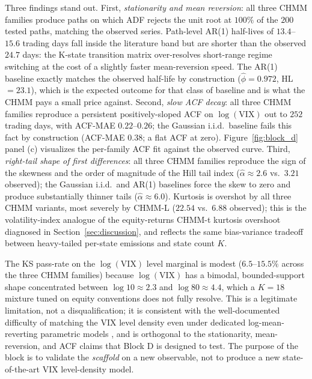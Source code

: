 Three findings stand out.
First, \emph{stationarity and mean reversion}: all three CHMM families produce paths on which ADF rejects the unit root at $100\%$ of the $200$ tested paths, matching the observed series.
Path-level AR(1) half-lives of $13.4$--$15.6$ trading days fall inside the literature band but are shorter than the observed $24.7$ days: the K-state transition matrix over-resolves short-range regime switching at the cost of a slightly faster mean-reversion speed.
The AR(1) baseline exactly matches the observed half-life by construction (${\hat\phi = 0.972}$, HL $= 23.1$), which is the expected outcome for that class of baseline and is what the CHMM pays a small price against.
Second, \emph{slow ACF decay}: all three CHMM families reproduce a persistent positively-sloped ACF on $\log(\text{VIX})$ out to $252$ trading days, with ACF-MAE $0.22$--$0.26$; the Gaussian i.i.d.\ baseline fails this fact by construction (ACF-MAE $0.38$; a flat ACF at zero).
Figure~\ref{fig:block_d} panel (c) visualizes the per-family ACF fit against the observed curve.
Third, \emph{right-tail shape of first differences}: all three CHMM families reproduce the sign of the skewness and the order of magnitude of the Hill tail index ($\hat\alpha \approx 2.6$ vs.\ $3.21$ observed); the Gaussian i.i.d.\ and AR(1) baselines force the skew to zero and produce substantially thinner tails ($\hat\alpha \approx 6.0$).
Kurtosis is overshot by all three CHMM variants, most severely by CHMM-L ($22.54$ vs.\ $6.88$ observed); this is the volatility-index analogue of the equity-returns CHMM-t kurtosis overshoot diagnosed in Section~\ref{sec:discussion}, and reflects the same bias-variance tradeoff between heavy-tailed per-state emissions and state count $K$.

The KS pass-rate on the $\log(\text{VIX})$ level marginal is modest ($6.5$--$15.5\%$ across the three CHMM families) because $\log(\text{VIX})$ has a bimodal, bounded-support shape concentrated between $\log 10 \approx 2.3$ and $\log 80 \approx 4.4$, which a $K = 18$ mixture tuned on equity conventions does not fully resolve.
This is a legitimate limitation, not a disqualification; it is consistent with the well-documented difficulty of matching the VIX level density even under dedicated log-mean-reverting parametric models \cite{kaeck2013stochastic}, and is orthogonal to the stationarity, mean-reversion, and ACF claims that Block D is designed to test.
The purpose of the block is to validate the \emph{scaffold} on a new observable, not to produce a new state-of-the-art VIX level-density model.

